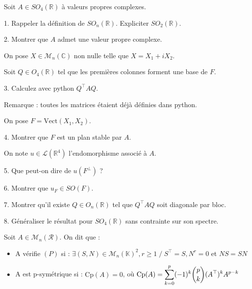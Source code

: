 \subetoiles
\columnbreak



\noindent Soit $A \in SO_4(\mathbb{R})$ à valeurs propres complexes.

\vspace{5pt}
1. Rappeler la définition de $SO_n(\mathbb{R})$. Expliciter $SO_2(\mathbb{R})$.

\vspace{5pt}
2. Montrer que $A$ admet une valeur propre complexe.

\vspace{5pt}
\noindent On pose $X \in \mathcal{M}_n(\mathbb{C})$ non nulle telle que $X = X_1 + iX_2$.

\noindent Soit $Q \in O_4(\mathbb{R})$ tel que les premières colonnes forment une base de $F$.

\vspace{5pt}
3. Calculez avec python $Q^\top AQ$.

Remarque : toutes les matrices étaient déjà définies dans python.

\vspace{5pt}
\noindent On pose $F = \mathrm{Vect}(X_1, X_2)$.

\vspace{5pt}
4. Montrer que $F$ est un plan stable par $A$.

\vspace{5pt}
\noindent On note $u \in \mathcal{L}(\mathbb{R}^4)$ l'endomorphisme associé à $A$.

\vspace{5pt}
5. Que peut-on dire de $u(F^\bot)$ ?

\vspace{5pt}
6. Montrer que $u_F \in SO(F)$.

\vspace{5pt}
7. Montrer qu'il existe $Q \in O_n(\mathbb{R})$ tel que $Q^\top AQ$ soit diagonale par bloc.

\vspace{5pt}
8. Généraliser le résultat pour $SO_4(\mathbb{R})$ sans contrainte sur son spectre.



\subetoiles
\columnbreak



\noindent Soit $A \in \mathcal{M}_n(\mathcal{R})$. On dit que :
\begin{itemize}
  \item A vérifie $(P)$ si : $\exists (S,N) \in  \mathcal{M}_n(\mathbb{K})^2, r \geqslant 1 \;/\; S^\top = S, N^r = 0$ et $NS = SN$ \\
  \item A est p-symétrique si : $\mathrm{Cp}(A) = 0$, où $\displaystyle \mathrm{Cp}(A) = \sum_{k=0}^{p}(-1)^k\dbinom{p}{k}(A^\top)^kA^{p-k}$ \\
\end{itemize}

